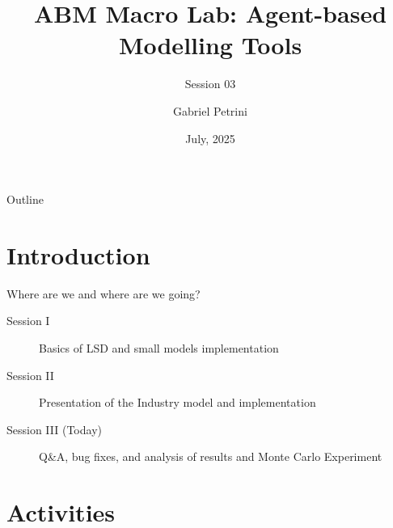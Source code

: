 \documentclass[bigger,aspectratio=169]{beamer}
\author{Gabriel Petrini}
\date{July, 2025}
\title{ABM Macro Lab: Agent-based Modelling Tools}
\subtitle{Session 03}
\begin{document}
\maketitle
\begin{frame}{Outline}
\tableofcontents
\end{frame}

\section{Introduction}
\label{sec:orgadb271e}


\begin{frame}[label={sec:orge23ae08}]{Where are we and where are we going?}
\begin{description}
\item[{Session I}] Basics of LSD and small models implementation
\item[{Session II}] Presentation of the Industry model and implementation
\item[{Session III (Today)}] Q\&A, bug fixes, and analysis of results and Monte Carlo Experiment
\end{description}
\end{frame}
\section{Activities}
\label{sec:org9dd7500}
\end{document}
